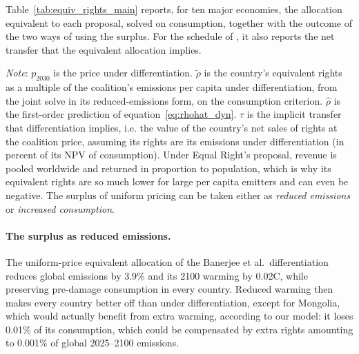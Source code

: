 \documentclass[12pt,english]{article}
\theoremstyle{remark}
\begin{document}
Table~\ref{tab:equiv_rights_main} reports, for ten major economies, the allocation equivalent to each proposal, solved on consumption, together with the outcome of the two ways of using the surplus. For the schedule of \citet{banerjee_grand_2025}, it also reports the net transfer that the equivalent allocation implies.

\begin{table}[!ht]
\centering
\small
\singlespacing
\caption{Equivalent rights of three differentiated-price schedules, and the surplus of a uniform price.}
\label{tab:equiv_rights_main}
\begin{minipage}{\textwidth}\footnotesize\singlespacing
\emph{Note}:
$p_{2030}$ is the price under differentiation.
$\tilde\rho$ is the country's equivalent rights as a multiple of the coalition's emissions per capita under differentiation, from the joint solve in its reduced-emissions form,
on the consumption criterion.
$\hat\rho$ is the first-order prediction of equation~\eqref{eq:rhohat_dyn}. $\tau$ is the implicit transfer that differentiation implies, i.e. the value of the country's net sales of rights at the coalition price, assuming its rights are its emissions under differentiation (in percent of its NPV of consumption).
Under Equal Right's proposal, revenue is pooled worldwide and returned in proportion to population, which is why its equivalent rights are so much lower for large per capita emitters and can even be negative.
The surplus of uniform pricing can be taken either as \emph{reduced emissions} or \emph{increased consumption}.
\end{minipage}
\end{table}
\FloatBarrier

\paragraph{The surplus as reduced emissions.} The uniform-price equivalent allocation of the Banerjee et al.\ differentiation reduces global emissions by 3.9\% and its 2100 warming by 0.02\textdegree C, while preserving pre-damage consumption in every country.
Reduced warming then makes every country better off than under differentiation, except for Mongolia, which would actually benefit from extra warming, according to our model:
it loses 0.01\% of its consumption, which could be compensated by extra rights amounting to 0.001\% of global 2025--2100 emissions.
\end{document}
